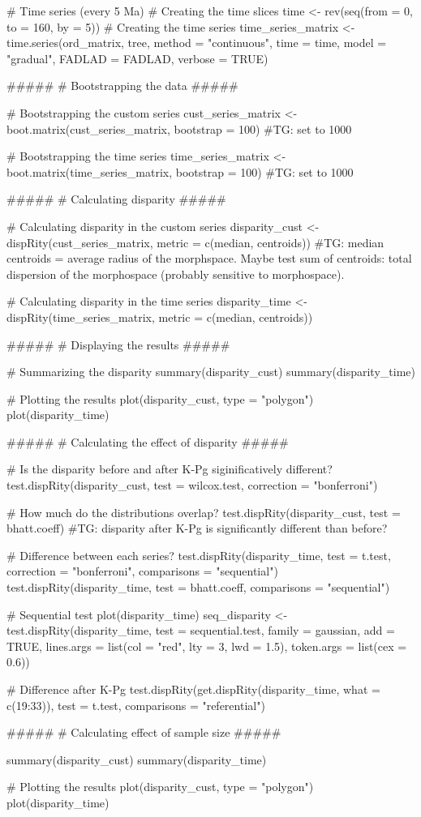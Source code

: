 # Time series (every 5 Ma)
# Creating the time slices
time <- rev(seq(from = 0, to = 160, by = 5))
# Creating the time series
time_series_matrix <- time.series(ord_matrix, tree, method = "continuous", time = time, model = "gradual", FADLAD = FADLAD, verbose = TRUE)

#####
# Bootstrapping the data
#####

# Bootstrapping the custom series
cust_series_matrix <- boot.matrix(cust_series_matrix, bootstrap = 100) #TG: set to 1000

# Bootstrapping the time series
time_series_matrix <- boot.matrix(time_series_matrix, bootstrap = 100) #TG: set to 1000

#####
# Calculating disparity
#####

# Calculating disparity in the custom series
disparity_cust <- dispRity(cust_series_matrix, metric = c(median, centroids))
#TG: median centroids = average radius of the morphspace. Maybe test sum of centroids: total dispersion of the morphospace (probably sensitive to morphospace).

# Calculating disparity in the time series
disparity_time <- dispRity(time_series_matrix, metric = c(median, centroids))

#####
# Displaying the results
#####

# Summarizing the disparity
summary(disparity_cust)
summary(disparity_time)

# Plotting the results
plot(disparity_cust, type = "polygon")
plot(disparity_time)

#####
# Calculating the effect of disparity
#####

# Is the disparity before and after K-Pg siginificatively different?
test.dispRity(disparity_cust, test = wilcox.test, correction = "bonferroni")

# How much do the distributions overlap?
test.dispRity(disparity_cust, test = bhatt.coeff)
#TG: disparity after K-Pg is significantly different than before?

# Difference between each series?
test.dispRity(disparity_time, test = t.test, correction = "bonferroni", comparisons = "sequential")
test.dispRity(disparity_time, test = bhatt.coeff, comparisons = "sequential")

# Sequential test
plot(disparity_time)
seq_disparity <- test.dispRity(disparity_time, test = sequential.test, family = gaussian, add = TRUE, lines.args = list(col = "red", lty = 3, lwd = 1.5), token.args = list(cex = 0.6))

# Difference after K-Pg
test.dispRity(get.dispRity(disparity_time, what = c(19:33)), test = t.test, comparisons = "referential")



#####
# Calculating effect of sample size
#####


summary(disparity_cust)
summary(disparity_time)

# Plotting the results
plot(disparity_cust, type = "polygon")
plot(disparity_time)
